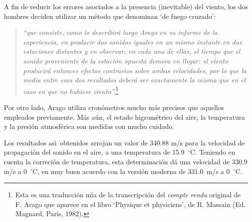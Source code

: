 \documentclass{article}
\begin{document}
A fin de reducir los errores asociados a la presencia (inevitable) del viento,
los dos hombres deciden utilizar un m\'etodo que denominan `de fuego cruzado':

\begin{quote}
{\it 
``que consiste, como lo describir\'a luego Arago en su informe de la experiencia,
en producir dos sonidos iguales en un mismo instante en dos estaciones 
distantes y en observar, en cada una de ellas, el tiempo que el sonido 
proveniente de la estaci\'on opuesta demora en llegar: el viento producir\'a
entonces efectos contrarios sobre ambas velocidades, por lo que la media
entre esos dos resultados deber\'a ser exactamente la misma que en el caso
en que no hubiese viento''.}\footnote{Esta es una traducci\'on m\'\i a de la
transcripci\'on del {\it compte rendu} original de F. Arago que aparece en 
el libro `Physique et physiciens', de R. Massain (Ed. Magnard, Paris, 1982).}
\end{quote}

Por otro lado, Arago utiliza cron\'ometros mucho m\'as precisos que aquellos
empleados previamente. M\'as a\'un, el estado higrom\'etrico del aire, la 
temperatura y la presi\'on atmosf\'erica son medidas con mucho cuidado. 

Los resultados as\'\i\  obtenidos arrojan un valor de 340.88 m/s para la 
velocidad de propagaci\'on del sonido en el aire, a una temperatura de
15.9~$^\circ$C. Teniendo en cuenta la correci\'on de temperatura, esta
determinaci\'on d\'a una velocidad de 330.9 m/s a 0~$^\circ$C, en muy buen
acuerdo con la versi\'on moderna de 331.0~m/s a 0~$^\circ$C.

    
    
\end{document}
